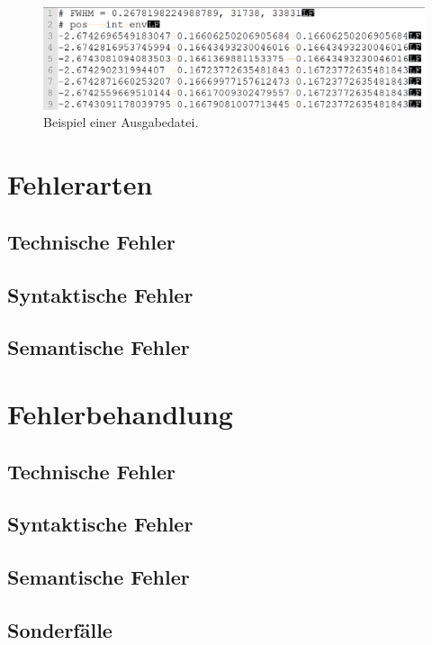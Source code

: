 \begin{figure}[htb]
    \centering
    \includegraphics[width=\linewidth]{images/ausgabeDat_bsp}
    \caption{
        Beispiel einer Ausgabedatei.
    }
    \label{fig:ausgabe_dat_beispiel}
\end{figure}

\section{Fehlerarten}\label{sec:fehlerarten}

\subsection{Technische Fehler}\label{subsec:technische-fehler}

\subsection{Syntaktische Fehler}\label{subsec:syntaktische-fehler}

\subsection{Semantische Fehler}\label{subsec:semantische-fehler}


\section{Fehlerbehandlung}\label{sec:fehlerbehandlung}

\subsection{Technische Fehler}\label{subsec:technische-fehler-behandlung}

\subsection{Syntaktische Fehler}\label{subsec:syntaktische-fehler-behandlung}

\subsection{Semantische Fehler}\label{subsec:semantische-fehler-behandlung}

\subsection{Sonderfälle}\label{subsec:sonderfaelle}
